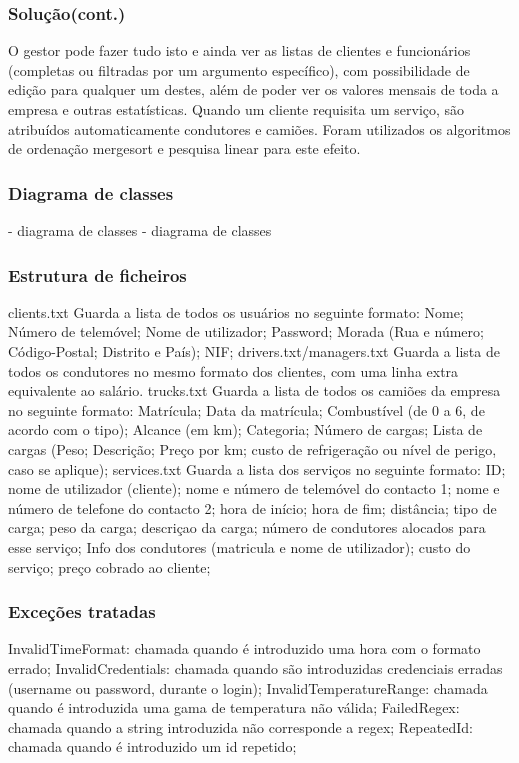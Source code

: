 \documentclass{beamer}
\def\\{}
\begin{document}
\begin{frame}
\frametitle{Solução(cont.)}

O gestor pode fazer tudo isto e ainda ver as listas de clientes e funcionários (completas ou filtradas por um argumento específico), com possibilidade de edição para qualquer um destes, além de poder ver os valores mensais de toda a empresa e outras estatísticas.\\
Quando um cliente requisita um serviço, são atribuídos automaticamente condutores e camiões.
Foram utilizados os algoritmos de ordenação mergesort e pesquisa linear para este efeito.
\end{frame}

\begin{frame}
\frametitle{Diagrama de classes}


- diagrama de classes
- diagrama de classes
\end{frame}

\begin{frame}
\frametitle{Estrutura de ficheiros}
clients.txt\\
Guarda a lista de todos os usuários no seguinte formato: Nome; Número de telemóvel; Nome de utilizador; Password; Morada (Rua e número; Código-Postal; Distrito e País); NIF;\\
drivers.txt/managers.txt\\
Guarda a lista de todos os condutores no mesmo formato dos clientes, com uma linha extra equivalente ao salário.
trucks.txt\\
Guarda a lista de todos os camiões da empresa no seguinte formato: Matrícula; Data da matrícula; Combustível (de 0 a 6, de acordo com o tipo); Alcance (em km); Categoria; Número de cargas; Lista de cargas (Peso; Descrição; Preço por km; custo de refrigeração ou nível de perigo, caso se aplique);\\
services.txt\\
Guarda a lista dos serviços no seguinte formato: ID; nome de utilizador (cliente); nome e número de telemóvel do contacto 1; nome e número de telefone do contacto 2; hora de início; hora de fim; distância; tipo de carga; peso da carga; descriçao da carga; número de condutores alocados para esse serviço; Info dos condutores (matricula e nome de utilizador); custo do serviço; preço cobrado ao cliente;
\end{frame}
 
\begin{frame}
\frametitle{Exceções tratadas}
InvalidTimeFormat: chamada quando é introduzido uma hora com o formato errado;\\
InvalidCredentials: chamada quando são introduzidas credenciais erradas (username ou password, durante o login);\\
InvalidTemperatureRange: chamada quando é introduzida uma gama de temperatura não válida;\\
FailedRegex: chamada quando a string introduzida não corresponde a regex;\\
RepeatedId: chamada quando é introduzido um id repetido;\\
\end{frame}
\end{document}
